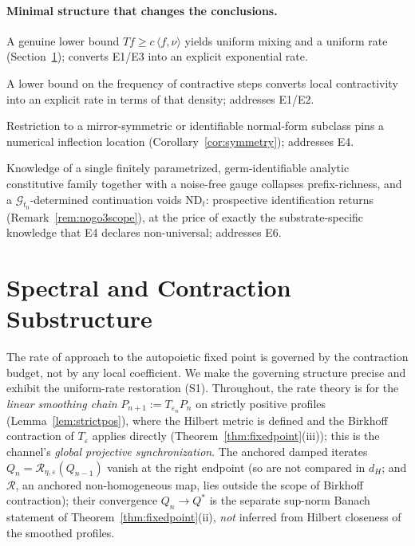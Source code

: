 \documentclass[11pt]{article}
\theoremstyle{plain}
\theoremstyle{definition}
\theoremstyle{remark}
\newcommand{\ip}[2]{\langle #1, #2\rangle}
\newcommand{\Rc}{\mathcal R}
\begin{document}
\paragraph{Minimal structure that changes the conclusions.}
\begin{description}[leftmargin=2.4em,style=nextline]
\item[\textnormal{(S1) Uniform minorization (Doeblin).}] A genuine lower bound $Tf\ge c\,\ip{f}{\nu}$ yields uniform mixing and a uniform rate (Section~\ref{sec:spectral}); converts E1/E3 into an explicit exponential rate.
\item[\textnormal{(S2) Time-structure (good-step density / bounded gaps).}] A lower bound on the frequency of contractive steps converts local contractivity into an explicit rate in terms of that density; addresses E1/E2.
\item[\textnormal{(S3) Symmetry / identifiability.}] Restriction to a mirror-symmetric or identifiable normal-form subclass pins a numerical inflection location (Corollary~\ref{cor:symmetry}); addresses E4.
\item[\textnormal{(S4) Exact constitutive germ.}] Knowledge of a single finitely parametrized, germ-identifiable analytic constitutive family together with a noise-free gauge collapses prefix-richness, and a $\mathcal G_{t_0}$-determined continuation voids $\mathrm{ND}_t$: prospective identification returns (Remark~\ref{rem:nogo3scope}), at the price of exactly the substrate-specific knowledge that E4 declares non-universal; addresses E6.
\end{description}

\section{Spectral and Contraction Substructure}\label{sec:spectral}

The rate of approach to the autopoietic fixed point is governed by the contraction budget, not by any local coefficient. We make the governing structure precise and exhibit the uniform-rate restoration (S1). Throughout, the rate theory is for the \emph{linear smoothing chain} $P_{n+1}:=T_{\varepsilon_n}P_n$ on strictly positive profiles (Lemma~\ref{lem:strictpos}), where the Hilbert metric is defined and the Birkhoff contraction of $T_\varepsilon$ applies directly (Theorem~\ref{thm:fixedpoint}(iii)); this is the channel's \emph{global projective synchronization}. The anchored damped iterates $Q_n=\Rc_{\eta,\varepsilon}(Q_{n-1})$ vanish at the right endpoint (so are not compared in $d_H$; and $\Rc$, an anchored non-homogeneous map, lies outside the scope of Birkhoff contraction); their convergence $Q_n\to Q^*$ is the separate sup-norm Banach statement of Theorem~\ref{thm:fixedpoint}(ii), \emph{not} inferred from Hilbert closeness of the smoothed profiles.
\end{document}
